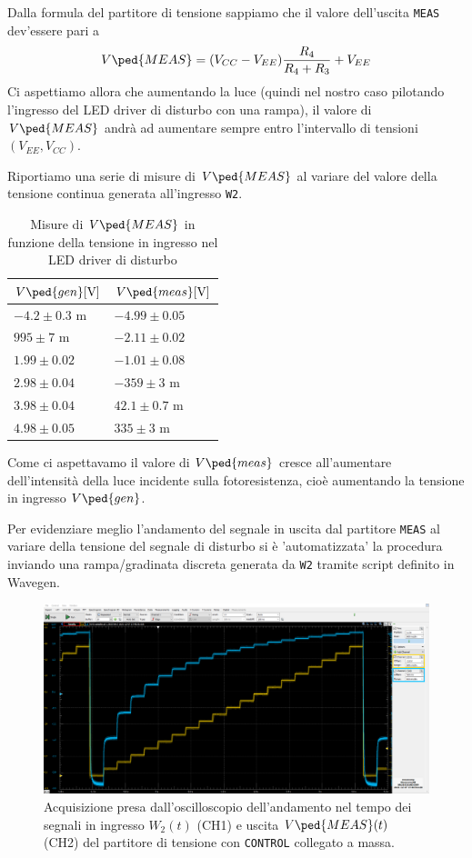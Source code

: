 \documentclass[10pt, a4paper, italian]{article}
\begin{document}
Dalla formula del partitore di tensione sappiamo che il valore dell'uscita
\verb+MEAS+ dev'essere pari a
\begin{equation}
V\ped{MEAS} = (V_{CC} -  V_{EE})\frac{R_4}{R_4 + R_3} + V_{EE}
\end{equation}
Ci aspettiamo allora che aumentando la luce (quindi nel nostro caso pilotando
l'ingresso del LED driver di disturbo con una rampa), il valore di
$V\ped{MEAS}$ andrà ad aumentare sempre entro l'intervallo di tensioni
$(V_{EE}, V_{CC})$.

Riportiamo una serie di misure di $V\ped{MEAS}$ al variare del valore della
tensione continua generata all'ingresso \verb+W2+.
\begin{table}[htbp]
\centering
\begin{tabular}{@{}ll@{}}
\toprule
$V\ped{gen} [\si{\V}]$ & $V\ped{meas} [\si{\V}]$\\
\midrule
$-4.2 \pm 0.3$ m 	& $ -4.99 \pm 0.05$	\\
$995 \pm 7$ m 	& $ -2.11 \pm 0.02 $	\\
$1.99 \pm 0.02$ 	& $ -1.01 \pm 0.08 $\\
$2.98 \pm 0.04$ 	& $ -359 \pm 3 $ m\\
$3.98 \pm 0.04$ 	& $ 42.1 \pm 0.7 $ m\\
$4.98 \pm 0.05$ 	& $ 335 \pm 3$ m\\
\bottomrule
\end{tabular}
\caption{Misure di $V\ped{MEAS}$ in funzione della tensione in ingresso nel
LED driver di disturbo}
\end{table}
Come ci aspettavamo il valore di $V\ped{meas}$ cresce all'aumentare
dell'intensità della luce incidente sulla fotoresistenza, cioè aumentando la
tensione in ingresso $V\ped{gen}$.

Per evidenziare meglio l'andamento del segnale in uscita dal partitore
\verb+MEAS+ al variare della tensione del segnale di disturbo si è
'automatizzata' la procedura inviando una rampa/gradinata discreta generata
da \verb+W2+ tramite script definito in Wavegen.
\begin{figure}[htbp]
    \centering
	\includegraphics[width=\textwidth]{measgrad}
    \caption{Acquisizione presa dall'oscilloscopio dell'andamento nel tempo dei
	segnali in ingresso $W_2 (t)$ (CH1) e uscita $V\ped{MEAS} (t)$ (CH2)
	del partitore di tensione con \texttt{CONTROL} collegato a massa.
    \label{fig: measgrad}}
\end{figure}
\end{document}
